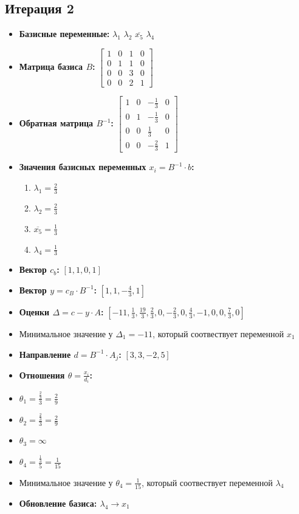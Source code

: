 \begin{itemize}
\subsection*{Итерация 2}
\begin{itemize}
\item \textbf{Базисные переменные:}
$\lambda_1$
$\lambda_2$
$\overline{x_{5}}$
$\lambda_4$
\item \textbf{Матрица базиса $B$:}
$\left[\begin{matrix}1 & 0 & 1 & 0\\0 & 1 & 1 & 0\\0 & 0 & 3 & 0\\0 & 0 & 2 & 1\end{matrix}\right]$
\item \textbf{Обратная матрица $B^{-1}$:}
$\left[\begin{matrix}1 & 0 & - \frac{1}{3} & 0\\0 & 1 & - \frac{1}{3} & 0\\0 & 0 & \frac{1}{3} & 0\\0 & 0 & - \frac{2}{3} & 1\end{matrix}\right]$
\item \textbf{Значения базисных переменных $ x_i = B^{-1} \cdot b$:}
\begin{enumerate}
\item $\lambda_1 = \frac{2}{3}$
\item $\lambda_2 = \frac{2}{3}$
\item $\overline{x_{5}} = \frac{1}{3}$
\item $\lambda_4 = \frac{1}{3}$
\end{enumerate}
\item \textbf{Вектор $c_b$:}
$[1, 1, 0, 1]$
\item \textbf{Вектор $y = c_B \cdot B^{-1}$:}
$[1, 1, - \frac{4}{3}, 1]$
\item \textbf{Оценки $\Delta = c - y \cdot A$:}
$[-11, \frac{1}{3}, \frac{19}{3}, \frac{2}{3}, 0, - \frac{2}{3}, 0, \frac{4}{3}, -1, 0, 0, \frac{7}{3}, 0]$
\item Минимальное значение у  $\Delta_{1} = -11$, который соотвествует переменной $x_{1}$
\item \textbf{Направление $d = B^{-1} \cdot A_j$:}
$[3, 3, -2, 5]$
\item \textbf{Отношения $\theta = \frac{x_i}{d_i}$:}
\item $\theta_{1} = \frac{\frac{2}{3}}{3} = \frac{2}{9}$
\item $\theta_{2} = \frac{\frac{2}{3}}{3} = \frac{2}{9}$
\item $\theta_{3} = \infty$
\item $\theta_{4} = \frac{\frac{1}{3}}{5} = \frac{1}{15}$
\item Минимальное значение у  $\theta_{4} = \frac{1}{15}$, который соотвествует переменной $\lambda_4$
\item \textbf{Обновление базиса: $\lambda_4 \rightarrow x_{1}$}
\end{itemize}
\newpage

\end{itemize}
